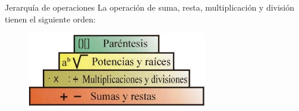 \begin{infocard}{Jerarquía de operaciones}
    La operación de suma, resta, multiplicación y división tienen el siguiente orden:
    \begin{figure}[H]
        \centering
        \includegraphics[width=0.7\textwidth]{../images/jerarquia}
    \end{figure}
\end{infocard}



